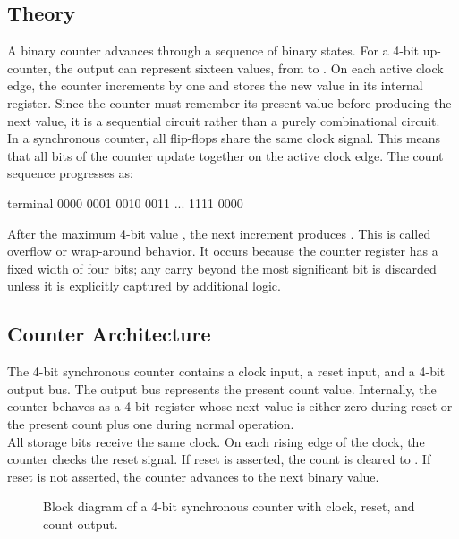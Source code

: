 \subsection{Theory}
A binary counter advances through a sequence of binary states. For a 4-bit up-counter, the output
can represent sixteen values, from  to . On each active clock
edge, the counter increments by one and stores the new value in its internal register. Since the
counter must remember its present value before producing the next value, it is a sequential circuit
rather than a purely combinational circuit.\\

\noindent In a synchronous counter, all flip-flops share the same clock signal. This means that all
bits of the counter update together on the active clock edge. The count sequence progresses as:

\begin{codeblock}{terminal}
0000
0001
0010
0011
...
1111
0000
\end{codeblock}

\noindent After the maximum 4-bit value , the next increment produces
. This is called overflow or wrap-around behavior. It occurs because the counter
register has a fixed width of four bits; any carry beyond the most significant bit is discarded
unless it is explicitly captured by additional logic.

\subsection{Counter Architecture}
The 4-bit synchronous counter contains a clock input, a reset input, and a 4-bit output bus. The
output bus represents the present count value. Internally, the counter behaves as a 4-bit register
whose next value is either zero during reset or the present count plus one during normal operation.\\

\noindent All storage bits receive the same clock. On each rising edge of the clock, the counter
checks the reset signal. If reset is asserted, the count is cleared to . If reset
is not asserted, the counter advances to the next binary value.

\begin{figure}[H]
    \centering
    \caption{Block diagram of a 4-bit synchronous counter with clock, reset, and count output.}
    \label{fig:synchronous_counter_block}
\end{figure}

